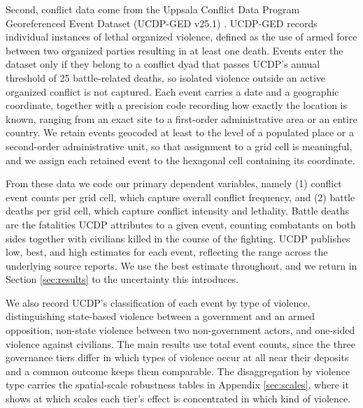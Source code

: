 \documentclass[11pt]{article}
\begin{document}
Second, conflict data come from the Uppsala Conflict Data Program Georeferenced Event Dataset (UCDP-GED v25.1) \citep{sundberg2013ucdp, pettersson2021organized}. UCDP-GED records individual instances of lethal organized violence, defined as the use of armed force between two organized parties resulting in at least one death. Events enter the dataset only if they belong to a conflict dyad that passes UCDP's annual threshold of 25 battle-related deaths, so isolated violence outside an active organized conflict is not captured. Each event carries a date and a geographic coordinate, together with a precision code recording how exactly the location is known, ranging from an exact site to a first-order administrative area or an entire country. We retain events geocoded at least to the level of a populated place or a second-order administrative unit, so that assignment to a grid cell is meaningful, and we assign each retained event to the hexagonal cell containing its coordinate.

From these data we code our primary dependent variables, namely (1) conflict event counts per grid cell, which capture overall conflict frequency, and (2) battle deaths per grid cell, which capture conflict intensity and lethality. Battle deaths are the fatalities UCDP attributes to a given event, counting combatants on both sides together with civilians killed in the course of the fighting. UCDP publishes low, best, and high estimates for each event, reflecting the range across the underlying source reports. We use the best estimate throughout, and we return in Section \ref{sec:results} to the uncertainty this introduces.

We also record UCDP's classification of each event by type of violence, distinguishing state-based violence between a government and an armed opposition, non-state violence between two non-government actors, and one-sided violence against civilians. The main results use total event counts, since the three governance tiers differ in which types of violence occur at all near their deposits and a common outcome keeps them comparable. The disaggregation by violence type carries the spatial-scale robustness tables in Appendix \ref{sec:scales}, where it shows at which scales each tier's effect is concentrated in which kind of violence.
\end{document}
